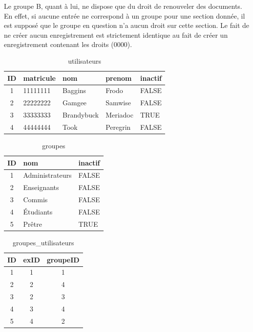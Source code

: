 \documentclass[letter, 11pt]{report}
\begin{document}
Le groupe B, quant à lui, ne dispose que du droit de renouveler des documents. En effet, si aucune entrée ne correspond à un groupe pour une section donnée, il est supposé que le groupe en question n'a aucun droit sur cette section. Le fait de ne créer aucun enregistrement est strictement identique au fait de créer un enregistrement contenant les droits (0000).

\begin{table}[h!]
	\caption{utilisateurs}
	\begin{center}
		\begin{tabular}{|c|l|l|l|l|}
			\hline
			ID & matricule & nom         & prenom   & inactif \\
			\hline
			1  & 11111111  & Baggins     & Frodo    & FALSE \\
			2  & 22222222  & Gamgee      & Samwise  & FALSE \\
			3  & 33333333  & Brandybuck  & Meriadoc & TRUE \\
			4  & 44444444  & Took        & Peregrin & FALSE \\
			\hline
		\end{tabular}
	\end{center}
\end{table}

\begin{table}[h!]
	\caption{groupes}
	\begin{center}
		\begin{tabular}{|c|l|l|}
			\hline
			ID & nom               & inactif \\
			\hline
			1  & Administrateurs   & FALSE \\
			2  & Enseignants       & FALSE \\
			3  & Commis            & FALSE \\
			4  & Étudiants         & FALSE \\
			5  & Prêtre            & TRUE \\
			\hline
		\end{tabular}
	\end{center}
\end{table}

\begin{table}[h!]
	\caption{groupes\_utilisateurs}
	\begin{center}
		\begin{tabular}{|c|c|c|}
			\hline
			ID & exID & groupeID \\
			\hline
			1  & 1    & 1 \\
			2  & 2    & 4 \\
			3  & 2    & 3 \\
			4  & 3    & 4 \\
			5  & 4    & 2 \\
			\hline
		\end{tabular}
	\end{center}
\end{table}
\end{document}
